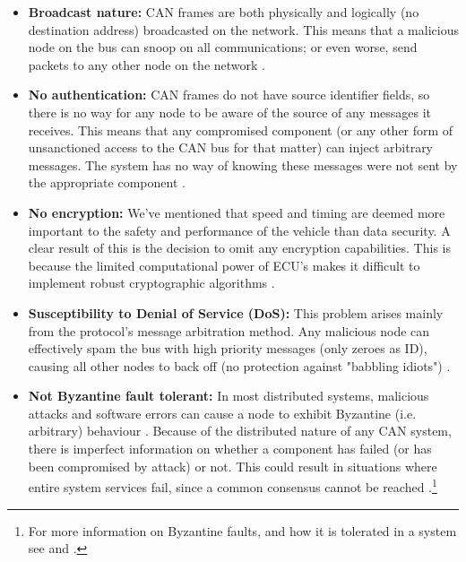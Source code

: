 \begin{itemize}
	\item \textbf{Broadcast nature:} CAN frames are both physically and logically (no destination address) broadcasted on the network. This means that a malicious node on the bus can snoop on all communications; or even worse, send packets to any other node on the network \cite{Kosher}. 
	
	\item \textbf{No authentication:} CAN frames do not have source identifier fields, so there is no way for any node to be aware of the source of any messages it receives. This means that any compromised component (or any other form of unsanctioned access to the CAN bus for that matter) can inject arbitrary messages. The system has no way of knowing these messages were not sent by the appropriate component \cite{Kosher,CANissues}.
	
	\item \textbf{No encryption:} We've mentioned that speed and timing are deemed more important to the safety and performance of the vehicle than data security. A clear result of this is the decision to omit any encryption capabilities. This is because the limited  computational power of ECU's makes it difficult to implement robust cryptographic algorithms \cite{CANissues}.  
	
	\item \textbf{Susceptibility to Denial of Service (DoS):} This problem arises mainly from the protocol's message arbitration method. Any malicious node can effectively spam the bus with high priority messages (only zeroes as ID), causing all other nodes to back off (no protection against "babbling idiots") \cite{Kosher,Pike15}.
	
	\item \textbf{Not Byzantine fault tolerant:} In most distributed systems, malicious attacks and software errors can cause a node to exhibit Byzantine (i.e. arbitrary) behaviour \cite{Byzantine}. Because of the distributed nature of any CAN system, there is imperfect information on whether a component has failed (or has been compromised by attack) or not. This could result in situations where entire system services fail, since a common consensus cannot be reached \cite{wiki:ByzantineFault}.\footnote{For more information on Byzantine faults, and how it is tolerated in a system see \cite{Byzantine} and \cite{wiki:ByzantineFault}.}
	
\end{itemize}

